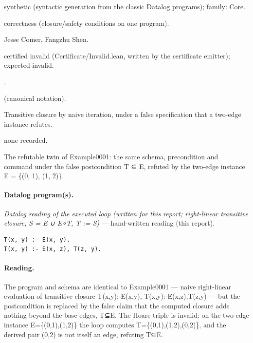 \documentclass[10pt]{article}
\begin{document}
\begin{description}[leftmargin=2.6cm,style=nextline,itemsep=1pt]

\item[Category] synthetic (syntactic generation from the classic Datalog programs); family: Core.

\item[Kind] correctness (closure/safety conditions on one program).

\item[Contributors] Jesse Comer, Fangzhu Shen.

\item[Status] certified invalid (Certificate/Invalid.lean, written by the certificate emitter); expected invalid.

\item[Tags] .

\item[Input]  (canonical notation).

\item[Summary] Transitive closure by naive iteration, under a false specification that a two-edge instance refutes.

\item[Sources] none recorded.

\item[Note] The refutable twin of Example0001: the same schema, precondition and command under the false postcondition T ⊆ E, refuted by the two-edge instance E = \{(0, 1), (1, 2)\}.

\end{description}

\paragraph{Datalog program(s).}

{\raggedright\textit{Datalog reading of the executed loop (written for this report; right-linear transitive closure, S = E ∪ E∘T, T := S)} --- hand-written reading (this report).\par}

\begin{Verbatim}[fontsize=\scriptsize,breaklines=true,breakanywhere=true,frame=single,framesep=1.5mm]
T(x, y) :- E(x, y).
T(x, y) :- E(x, z), T(z, y).
\end{Verbatim}

\paragraph{Reading.} The program and schema are identical to Example0001 --- naive right-linear evaluation of transitive closure T(x,y):-E(x,y), T(x,y):-E(x,z),T(z,y) --- but the postcondition is replaced by the false claim that the computed closure adds nothing beyond the base edges, T⊆E. The Hoare triple is invalid: on the two-edge instance E=\{(0,1),(1,2)\} the loop computes T=\{(0,1),(1,2),(0,2)\}, and the derived pair (0,2) is not itself an edge, refuting T⊆E.
\end{document}
